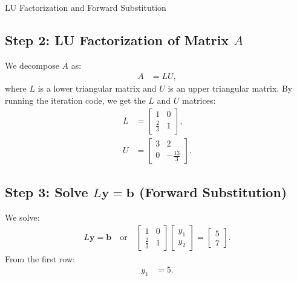 \documentclass{beamer}
\begin{document}
	\begin{frame}{LU Factorization and Forward Substitution}
		\subsection*{Step 2: LU Factorization of Matrix $A$}
		We decompose $A$ as:
		\begin{align}
			A &= LU,
		\end{align}
		where $L$ is a lower triangular matrix and $U$ is an upper triangular matrix. By running the iteration code, we get the $L$ and $U$ matrices:
		\begin{align}
			L &= \begin{bmatrix} 1 & 0 \\ \frac{2}{3} & 1 \end{bmatrix}, \\
			U &= \begin{bmatrix} 3 & 2 \\ 0 & -\frac{13}{3} \end{bmatrix}.
		\end{align}
		
		\subsection*{Step 3: Solve $L\mathbf{y} = \mathbf{b}$ (Forward Substitution)}
		We solve:
		\begin{align}
			L\mathbf{y} = \mathbf{b} \quad \text{or} \quad 
			\begin{bmatrix} 1 & 0 \\ \frac{2}{3} & 1 \end{bmatrix} 
			\begin{bmatrix} y_1 \\ y_2 \end{bmatrix} = 
			\begin{bmatrix} 5 \\ 7 \end{bmatrix}.
		\end{align}
		From the first row:
		\begin{align}
			y_1 &= 5.
		\end{align}
	\end{frame}
\end{document}
